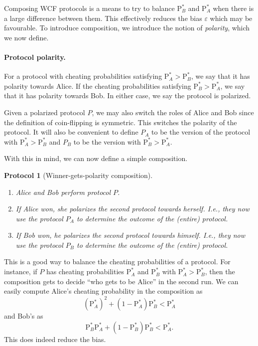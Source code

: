 \documentclass[11pt]{article}
\newtheorem{protocol}{Protocol}
\newcommand{\eps}{\varepsilon}
\newcommand{\PB}{\mathrm{P}_B^*}
\newcommand{\PA}{\mathrm{P}_A^*}
\begin{document}
Composing WCF protocols is a means to try to balance $\PB$ and $\PA$ when there is a large difference between them. 
This effectively reduces the bias $\eps$ which may be favourable. 
To introduce composition, we introduce the notion of \emph{polarity}, which we now define. 


\paragraph{Protocol polarity.} 
For a protocol with cheating probabilities satisfying $\PA > \PB$, we say that it has polarity towards Alice. 
If the cheating probabilities satisfying $\PB > \PA$, we say that it has polarity towards Bob. 
In either case, we say the protocol is polarized. 

Given a polarized protocol $P$, we may also switch the roles of Alice and Bob since the definition of coin-flipping is symmetric. 
This switches the polarity of the protocol. 
It will also be convenient to define $P_A$ to be the version of the protocol with $\PA > \PB$ and $P_B$ to be the version with $\PB > \PA$. 

With this in mind, we can now define a simple composition. 

\begin{protocol}[Winner-gets-polarity composition] \label{simple}  
\begin{enumerate} 
Alice and Bob agree on a protocol $P$. 
\item Alice and Bob perform protocol $P$. 
\item If Alice won, she polarizes the second protocol towards herself. I.e., they now use the protocol $P_A$ to determine the outcome of the (entire) protocol. 
\item If Bob won, he polarizes the second protocol towards himself. I.e., they now use the protocol $P_B$ to determine the outcome of the (entire) protocol.   
\end{enumerate} 
\end{protocol}  

This is a good way to balance the cheating probabilities of a protocol. 
For instance, if $P$ has cheating probabilities $\PA$ and $\PB$ with $\PA > \PB$, then the composition gets to decide ``who gets to be Alice'' in the second run.  
We can easily compute Alice's cheating probability in the composition as 
\begin{equation} \label{first}
(\PA)^2 + (1-\PA) \PB < \PA 
\end{equation}  
and Bob's as 
\begin{equation} \label{second}
\PB \PA + (1- \PB) \PB < \PA. 
\end{equation} 
This does indeed reduce the bias. 
\end{document}
